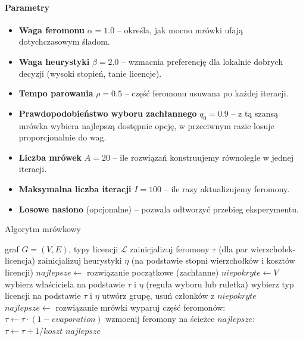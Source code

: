 \paragraph{Parametry}
\begin{itemize}
  \item \textbf{Waga feromonu} $\alpha=1.0$ -- określa, jak mocno mrówki ufają dotychczasowym śladom.
  \item \textbf{Waga heurystyki} $\beta=2.0$ -- wzmacnia preferencję dla lokalnie dobrych decyzji (wysoki stopień, tanie licencje).
  \item \textbf{Tempo parowania} $\rho=0.5$ -- część feromonu usuwana po każdej iteracji.
  \item \textbf{Prawdopodobieństwo wyboru zachłannego} $q_0=0.9$ -- z tą szansą mrówka wybiera najlepszą dostępnie opcję, w przeciwnym razie losuje proporcjonalnie do wag.
  \item \textbf{Liczba mrówek} $A=20$ -- ile rozwiązań konstruujemy równolegle w jednej iteracji.
  \item \textbf{Maksymalna liczba iteracji} $I=100$ -- ile razy aktualizujemy feromony.
  \item \textbf{Losowe nasiono} (opcjonalne) -- pozwala odtworzyć przebieg eksperymentu.
\end{itemize}

\begin{algorithm}[H]
  \caption{Algorytm mrówkowy}
  \label{alg:aco}
  \begin{algorithmic}[1]
    \Require graf $G=(V,E)$, typy licencji $\mathcal{L}$
    \State zainicjalizuj feromony $\tau$ (dla par wierzchołek-licencja)
    \State zainicjalizuj heurystyki $\eta$ (na podstawie stopni wierzchołków i kosztów licencji)
    \State $najlepsze \gets$ rozwiązanie początkowe (zachłanne)
    \State $niepokryte \gets V$
    \State wybierz właściciela na podstawie $\tau$ i $\eta$ (reguła wyboru lub ruletka)
    \State wybierz typ licencji na podstawie $\tau$ i $\eta$
    \State utwórz grupę, usuń członków z $niepokryte$
    \EndWhile
    \State $najlepsze \gets$ rozwiązanie mrówki
    \EndIf
    \EndFor
    \State wyparuj część feromonów: $\tau \gets \tau \cdot (1-evaporation)$
    \State wzmocnij feromony na ścieżce $najlepsze$: $\tau \gets \tau + 1/koszt$
    \EndFor
    \State \Return $najlepsze$
  \end{algorithmic}
\end{algorithm}

